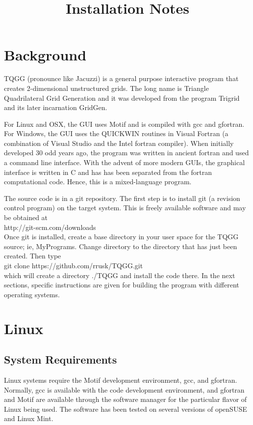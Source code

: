 \documentclass[10pt]{article}
\begin{document}
\title{Installation Notes}

\maketitle

\section{Background}
TQGG (pronounce like Jacuzzi) is a general purpose interactive program that creates
2-dimensional unstructured grids. The long name is Triangle Quadrilateral Grid Generation and it was
developed from the program Trigrid and its later incarnation GridGen.

For Linux and OSX, the GUI uses Motif and is compiled with gcc and gfortran. 
For Windows, the GUI uses the QUICKWIN routines in Visual Fortran (a combination of
Visual Studio and the Intel fortran compiler). When initially developed 30 odd years 
ago, the program was written in ancient fortran and used a command line interface. With
the advent of more modern GUIs, the graphical interface is written in C and has has 
been separated from the fortran computational code. Hence, this is a mixed-language program.

The source code is in a git repository. The first step is to install git (a revision control program)
on the target system. This is freely available software and may be obtained at \\

\noindent http://git-scm.com/downloads \\

Once git is installed, create a base directory in your user space for the TQGG source; ie, MyPrograms.
Change directory to the directory that has just been created. Then type \\

\noindent git clone https://github.com/rrusk/TQGG.git \\

\noindent which will create a directory ./TQGG and install the code there. In the next sections, 
specific instructions are given for building the program with different operating systems.


\section{Linux}
\subsection{System Requirements}
Linux systems require the Motif development environment, gcc, and gfortran. Normally, gcc is 
available with the code development environment, and gfortran and Motif are available through
the software manager for the particular flavor of Linux being used. The software has been
tested on several versions of openSUSE and Linux Mint. 
\end{document}
